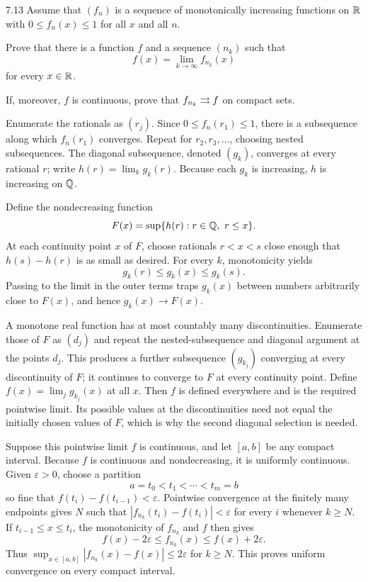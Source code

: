 \documentclass[11pt, oneside]{article}
\begin{document}
\begin{exercise}{7.13}
Assume that $(f_n)$ is a sequence of monotonically increasing functions on $\mathbb{R}$ with $0\le f_n(x)\le1$ for all $x$ and all $n$.
\begin{exercisesubparts}
\item Prove that there is a function $f$ and a sequence $(n_k)$ such that
\[
 f(x)=\lim_{k\to\infty}f_{n_k}(x)
\]
for every $x\in\mathbb{R}$.
\item If, moreover, $f$ is continuous, prove that $f_{n_k}\rightrightarrows f$ on compact sets.
\end{exercisesubparts}
\end{exercise}
\begin{solution}
\begin{exercisesubparts}
\item Enumerate the rationals as $(r_j)$. Since $0\le f_n(r_1)\le1$, there is a subsequence along which $f_n(r_1)$ converges. Repeat for $r_2, r_3, \ldots$, choosing nested subsequences. The diagonal subsequence, denoted $(g_k)$, converges at every rational $r$; write $h(r)=\lim_k g_k(r)$. Because each $g_k$ is increasing, $h$ is increasing on $\mathbb{Q}$.

Define the nondecreasing function
\[
 F(x)=\sup\{h(r):r\in\mathbb{Q}, \ r\le x\}.
\]
At each continuity point $x$ of $F$, choose rationals $r<x<s$ close enough that $h(s)-h(r)$ is as small as desired. For every $k$, monotonicity yields
\[
 g_k(r)\le g_k(x)\le g_k(s).
\]
Passing to the limit in the outer terms traps $g_k(x)$ between numbers arbitrarily close to $F(x)$, and hence $g_k(x)\to F(x)$.

A monotone real function has at most countably many discontinuities. Enumerate those of $F$ as $(d_j)$ and repeat the nested-subsequence and diagonal argument at the points $d_j$. This produces a further subsequence $(g_{k_j})$ converging at every discontinuity of $F$; it continues to converge to $F$ at every continuity point. Define $f(x)=\lim_jg_{k_j}(x)$ at all $x$. Then $f$ is defined everywhere and is the required pointwise limit. Its possible values at the discontinuities need not equal the initially chosen values of $F$, which is why the second diagonal selection is needed.

\item Suppose this pointwise limit $f$ is continuous, and let $[a, b]$ be any compact interval. Because $f$ is continuous and nondecreasing, it is uniformly continuous. Given $\varepsilon>0$, choose a partition
\[
 a=t_0<t_1<\cdots<t_m=b
\]
so fine that $f(t_i)-f(t_{i-1})<\varepsilon$. Pointwise convergence at the finitely many endpoints gives $N$ such that $|f_{n_k}(t_i)-f(t_i)|<\varepsilon$ for every $i$ whenever $k\ge N$. If $t_{i-1}\le x\le t_i$, the monotonicity of $f_{n_k}$ and $f$ then gives
\[
 f(x)-2\varepsilon\le f_{n_k}(x)\le f(x)+2\varepsilon.
\]
Thus $\sup_{x\in[a, b]}|f_{n_k}(x)-f(x)|\le2\varepsilon$ for $k\ge N$. This proves uniform convergence on every compact interval.
\end{exercisesubparts}
\end{solution}
\end{document}
